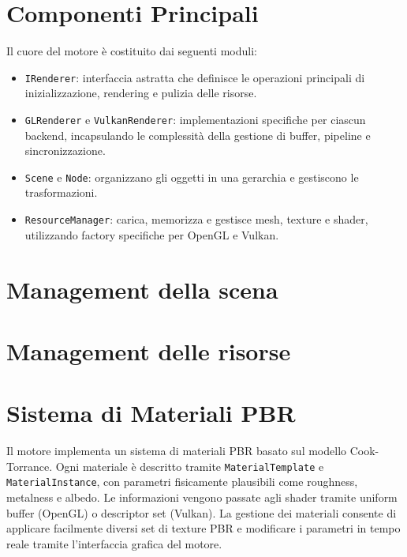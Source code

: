 \documentclass[12pt,a4paper,openright,twoside]{book}
\begin{document}
\section{Componenti Principali}
Il cuore del motore è costituito dai seguenti moduli:
\begin{itemize}
    \item \texttt{IRenderer}: interfaccia astratta che definisce le operazioni principali di inizializzazione,
          rendering e pulizia delle risorse.
    \item \texttt{GLRenderer} e \texttt{VulkanRenderer}: implementazioni specifiche per ciascun backend,
          incapsulando le complessità della gestione di buffer, pipeline e sincronizzazione.
    \item \texttt{Scene} e \texttt{Node}: organizzano gli oggetti in una gerarchia e gestiscono le trasformazioni.
    \item \texttt{ResourceManager}: carica, memorizza e gestisce mesh, texture e shader, utilizzando factory
          specifiche per OpenGL e Vulkan.
\end{itemize}

\section{Management della scena}

\section{Management delle risorse}

\section{Sistema di Materiali PBR}
Il motore implementa un sistema di materiali PBR basato sul modello Cook-Torrance. Ogni materiale è descritto
tramite \texttt{MaterialTemplate} e \texttt{MaterialInstance}, con parametri fisicamente plausibili come
roughness, metalness e albedo. Le informazioni vengono passate agli shader tramite uniform buffer (OpenGL) o
descriptor set (Vulkan).
La gestione dei materiali consente di applicare facilmente diversi set di texture PBR e modificare i parametri in
tempo reale tramite l'interfaccia grafica del motore.
\end{document}
